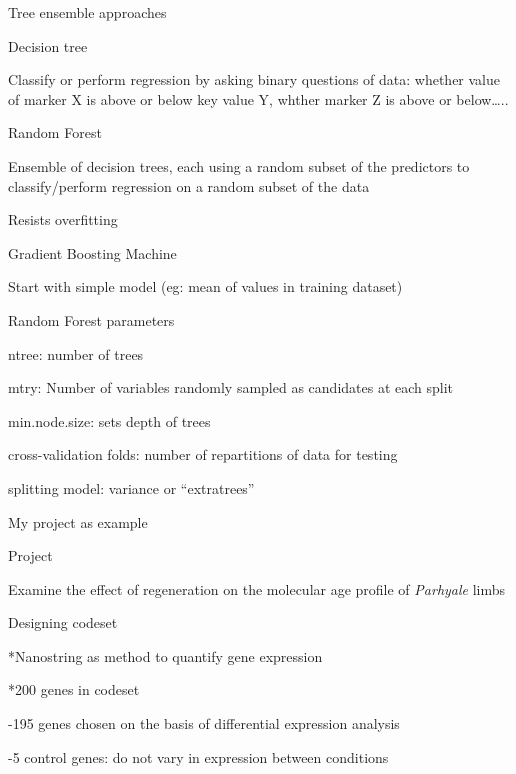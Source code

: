 \documentclass[ignorenonframetext,]{beamer}
\begin{document}
\begin{frame}{Tree ensemble approaches}

\begin{block}{Decision tree}

Classify or perform regression by asking binary questions of data:
whether value of marker X is above or below key value Y, whther marker Z
is above or below\ldots{}..

\end{block}

\begin{block}{Random Forest}

Ensemble of decision trees, each using a random subset of the predictors
to classify/perform regression on a random subset of the data

Resists overfitting

\end{block}

\begin{block}{Gradient Boosting Machine}

Start with simple model (eg: mean of values in training dataset)

\end{block}

\end{frame}

\begin{frame}{Random Forest parameters}

ntree: number of trees

mtry: Number of variables randomly sampled as candidates at each split

min.node.size: sets depth of trees

cross-validation folds: number of repartitions of data for testing

splitting model: variance or ``extratrees''

\end{frame}

\begin{frame}{My project as example}

\begin{block}{Project}

Examine the effect of regeneration on the molecular age profile of
\emph{Parhyale} limbs

\end{block}

\begin{block}{Designing codeset}

*Nanostring as method to quantify gene expression

*200 genes in codeset

-195 genes chosen on the basis of differential expression analysis

-5 control genes: do not vary in expression between conditions

\end{block}

\end{frame}
\end{document}
